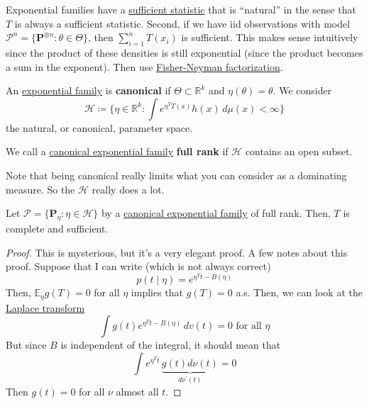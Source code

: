   Exponential families have a \hyperref[def:sufficient-statistic]{sufficient statistic} that is ``natural'' in the sense that $T$ is always a sufficient statistic. Second, if we have iid observations with model $\mathcal{P}^n = \{\mathbf{P}^{\otimes n} \colon \theta \in \Theta\}$, then $\sum_{i=1}^n T(x_i)$ is sufficient. This makes sense intuitively since the product of these densities is still exponential (since the product becomes a sum in the exponent). Then use \hyperref[thm:fisher-neyman-factorization]{Fisher-Neyman factorization}. 

  \begin{definition}
    \label{def:canonical-exponential-family}
    An \hyperref[def:exponential-family]{exponential family} is \textbf{canonical} if $\Theta \subset \mathbb{R}^k$ and $\eta (\theta) = \theta$. We consider 
    \begin{equation}
      \mathcal{H} \coloneqq \{\eta \in \mathbb{R}^k \colon \int e^{\eta^T T(x)} h(x) \, d\mu(x) < \infty \}
    \end{equation}
    the natural, or canonical, parameter space. 
  \end{definition}

  \begin{definition}
    \label{def:full-rank-exponential-family}
    We call a \hyperref[def:canonical-exponential-family]{canonical exponential family} \textbf{full rank} if $\mathcal{H}$ contains an open subset. 
  \end{definition}

  Note that being canonical really limits what you can consider as a dominating measure. So the $\mathcal{H}$ really does a lot. 

  \begin{theorem}
    \label{thm:properties-of-a-full-rank-canonical-family}
    Let $\mathcal{P} = \{\mathbf{P}_{\eta} \colon \eta \in \mathcal{H} \}$ by a \hyperref[def:canonical-exponential-family]{canonical exponential family} of full rank. Then, $T$ is complete and sufficient. 
  \end{theorem}
  \begin{proof}
    This is mysterious, but it's a very elegant proof. A few notes about this proof. Suppose that I can write (which is not always correct) 
    \begin{equation}
      p(t \mid \eta) = e^{\eta^T t - B(\eta)} 
    \end{equation}
    Then, $\mathbb{E}_{\eta} g(T) = 0$ for all $\eta$ implies that $g(T) = 0$ a.s. Then, we can look at the \hyperref[ode-def:laplace-transform]{Laplace transform} 
    \begin{equation}
      \int g(t) e^{\eta^T t - B(\eta)} \, dv(t) = 0 \text{ for all } \eta 
    \end{equation}
    But since $B$ is independent of the integral, it should mean that 
    \begin{equation}
      \int e^{\eta^T t} \, \underbrace{g(t) d\nu(t)}_{d \nu^\prime (t)} = 0
    \end{equation}
    Then $g(t) = 0$ for all $\nu$ almost all $t$. 
  \end{proof}

